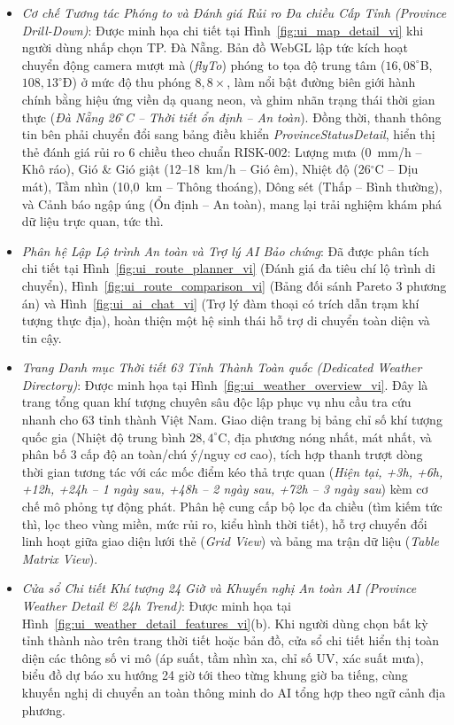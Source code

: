 \begin{itemize}
    \item[-] \textit{Cơ chế Tương tác Phóng to và Đánh giá Rủi ro Đa chiều Cấp Tỉnh (Province Drill-Down)}: Được minh họa chi tiết tại Hình~\ref{fig:ui_map_detail_vi} khi người dùng nhấp chọn TP. Đà Nẵng. Bản đồ WebGL lập tức kích hoạt chuyển động camera mượt mà (\textit{flyTo}) phóng to tọa độ trung tâm ($16,08^\circ$B, $108,13^\circ$Đ) ở mức độ thu phóng $8,8\times$, làm nổi bật đường biên giới hành chính bằng hiệu ứng viền dạ quang neon, và ghim nhãn trạng thái thời gian thực (\textit{Đà Nẵng 26$^\circ$C -- Thời tiết ổn định -- An toàn}). Đồng thời, thanh thông tin bên phải chuyển đổi sang bảng điều khiển \textit{ProvinceStatusDetail}, hiển thị thẻ đánh giá rủi ro 6 chiều theo chuẩn RISK-002: Lượng mưa (0~mm/h -- Khô ráo), Gió \& Gió giật (12--18~km/h -- Gió êm), Nhiệt độ (26$^\circ$C -- Dịu mát), Tầm nhìn (10,0~km -- Thông thoáng), Dông sét (Thấp -- Bình thường), và Cảnh báo ngập úng (Ổn định -- An toàn), mang lại trải nghiệm khám phá dữ liệu trực quan, tức thì.
    \item[-] \textit{Phân hệ Lập Lộ trình An toàn và Trợ lý AI Bảo chứng}: Đã được phân tích chi tiết tại Hình~\ref{fig:ui_route_planner_vi} (Đánh giá đa tiêu chí lộ trình di chuyển), Hình~\ref{fig:ui_route_comparison_vi} (Bảng đối sánh Pareto 3 phương án) và Hình~\ref{fig:ui_ai_chat_vi} (Trợ lý đàm thoại có trích dẫn trạm khí tượng thực địa), hoàn thiện một hệ sinh thái hỗ trợ di chuyển toàn diện và tin cậy.
    \item[-] \textit{Trang Danh mục Thời tiết 63 Tỉnh Thành Toàn quốc (Dedicated Weather Directory)}: Được minh họa tại Hình~\ref{fig:ui_weather_overview_vi}. Đây là trang tổng quan khí tượng chuyên sâu độc lập phục vụ nhu cầu tra cứu nhanh cho 63 tỉnh thành Việt Nam. Giao diện trang bị bảng chỉ số khí tượng quốc gia (Nhiệt độ trung bình $28,4^\circ$C, địa phương nóng nhất, mát nhất, và phân bố 3 cấp độ an toàn/chú ý/nguy cơ cao), tích hợp thanh trượt dòng thời gian tương tác với các mốc điểm kéo thả trực quan (\textit{Hiện tại, +3h, +6h, +12h, +24h -- 1 ngày sau, +48h -- 2 ngày sau, +72h -- 3 ngày sau}) kèm cơ chế mô phỏng tự động phát. Phân hệ cung cấp bộ lọc đa chiều (tìm kiếm tức thì, lọc theo vùng miền, mức rủi ro, kiểu hình thời tiết), hỗ trợ chuyển đổi linh hoạt giữa giao diện lưới thẻ (\textit{Grid View}) và bảng ma trận dữ liệu (\textit{Table Matrix View}).
    \item[-] \textit{Cửa sổ Chi tiết Khí tượng 24 Giờ và Khuyến nghị An toàn AI (Province Weather Detail \& 24h Trend)}: Được minh họa tại Hình~\ref{fig:ui_weather_detail_features_vi}(b). Khi người dùng chọn bất kỳ tỉnh thành nào trên trang thời tiết hoặc bản đồ, cửa sổ chi tiết hiển thị toàn diện các thông số vi mô (áp suất, tầm nhìn xa, chỉ số UV, xác suất mưa), biểu đồ dự báo xu hướng 24 giờ tới theo từng khung giờ ba tiếng, cùng khuyến nghị di chuyển an toàn thông minh do AI tổng hợp theo ngữ cảnh địa phương.

\end{itemize}
